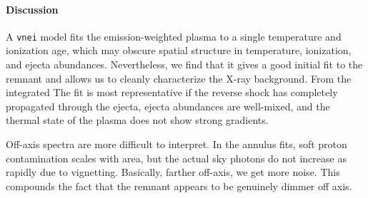 \documentclass[preprint2,tighten,trackchanges]{aastex6}
\begin{document}
\paragraph{Discussion}

A \texttt{vnei} model fits the emission-weighted plasma to a single temperature
and ionization age, which may obscure spatial structure in temperature,
ionization, and ejecta abundances.
Nevertheless, we find that it gives a good initial fit to the remnant and
allows us to cleanly characterize the X-ray background.
From the integrated
The fit is most representative if the reverse shock has completely propagated
through the ejecta, ejecta abundances are well-mixed, and the thermal state of
the plasma does not show strong gradients.

%
%
%
%
%


Off-axis spectra are more difficult to interpret.
In the annulus fits, soft proton contamination scales with area,
but the actual sky photons do not increase as rapidly due to vignetting.
Basically, farther off-axis, we get more noise.
This compounds the fact that the remnant appears to be genuinely dimmer off
axis.
\end{document}

